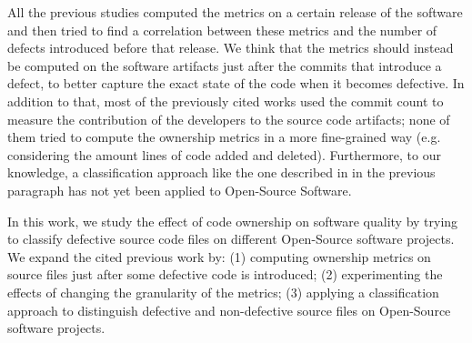 
All the previous studies computed the metrics on a certain release of the software and then tried to find a correlation between these metrics and the number of defects introduced before that release. We think that the metrics should instead be computed on the software artifacts just after the commits that introduce a defect, to better capture the exact state of the code when it becomes defective. In addition to that, most of the previously cited works used the commit count to measure the contribution of the developers to the source code artifacts; none of them tried to compute the ownership metrics in a more fine-grained way (e.g. considering the amount lines of code added and deleted). Furthermore, to our knowledge, a classification approach like the one described in in the previous paragraph has not yet been applied to Open-Source Software.


In this work, we study the effect of code ownership on software quality by trying to classify defective source code files on different Open-Source software projects. We expand the cited previous work by: (1) computing ownership metrics on source files just after some defective code is introduced; (2) experimenting the effects of changing the granularity of the metrics; (3) applying a classification approach to distinguish defective and non-defective source files on Open-Source software projects.

